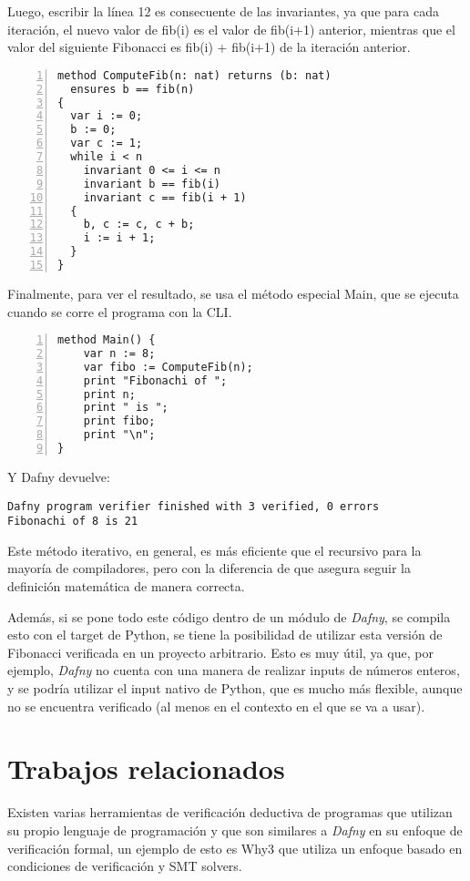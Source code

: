 \documentclass[runningheads]{llncs}
\begin{document}
Luego, escribir la línea 12 es consecuente de las invariantes, ya que para cada iteración, el nuevo valor de fib(i) es el valor de fib(i+1) anterior, mientras que
el valor del siguiente Fibonacci es fib(i) + fib(i+1) de la iteración anterior.

\begin{Verbatim}[numbers=left,xleftmargin=5mm]
method ComputeFib(n: nat) returns (b: nat)
  ensures b == fib(n)
{
  var i := 0;
  b := 0;
  var c := 1;
  while i < n
    invariant 0 <= i <= n
    invariant b == fib(i)
    invariant c == fib(i + 1)
  {
    b, c := c, c + b;
    i := i + 1;
  }
}
\end{Verbatim}

Finalmente, para ver el resultado, se usa el método especial Main, que se ejecuta cuando se corre el programa con la CLI.

\begin{Verbatim}[numbers=left,xleftmargin=5mm]
method Main() {
    var n := 8;
    var fibo := ComputeFib(n);
    print "Fibonachi of ";
    print n;
    print " is ";
    print fibo;
    print "\n";
}
\end{Verbatim}

Y Dafny devuelve:

\begin{verbatim}
Dafny program verifier finished with 3 verified, 0 errors
Fibonachi of 8 is 21
\end{verbatim}

Este método iterativo, en general, es más eficiente que el recursivo para la mayoría de compiladores, pero con la diferencia de que asegura seguir la definición matemática de manera correcta.

Además, si se pone todo este código dentro de un módulo de \textit{Dafny}, se compila esto con el target de Python, se tiene la posibilidad de utilizar esta versión de Fibonacci verificada en un proyecto arbitrario.
Esto es muy útil, ya que, por ejemplo, \textit{Dafny} no cuenta con una manera de realizar inputs de números enteros, y se podría utilizar el input nativo de Python, que es mucho más flexible, aunque no se encuentra verificado (al menos en el contexto en el que se va a usar).

\section{Trabajos relacionados} 
Existen varias herramientas de verificación deductiva de programas que utilizan su propio lenguaje de programación 
y que son similares a \textit{Dafny} en su enfoque de verificación formal, 
un ejemplo de esto es Why3 que utiliza un enfoque basado en condiciones de verificación y SMT solvers.
\end{document}
